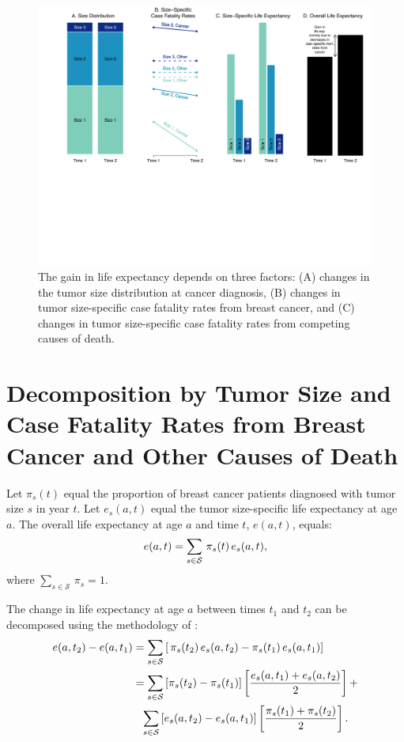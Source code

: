 \documentclass[11pt,letterpaper]{article}
\theoremstyle{plain}
\begin{document}
\begin{figure}[h]
\begin{center}
\includegraphics[trim=0 220 0 0,clip,width=\linewidth]{appendix_figure1}
\caption{The gain in life expectancy depends
  on three factors: (A) changes in the tumor size distribution at
  cancer diagnosis, (B) changes in tumor size-specific case fatality rates from
  breast cancer, and (C) changes in tumor size-specific case fatality rates from
  competing causes of death.}
\label{fig:simple_case}
\end{center}
\end{figure}

\section{Decomposition by Tumor Size and Case Fatality Rates from
  Breast Cancer and Other Causes of Death}
Let $\pi_s(t)$ equal the proportion of breast cancer patients
diagnosed with tumor size $s$ in year $t$.  Let $e_s(a,t)$ equal the
tumor size-specific life expectancy at age $a$. The overall life
expectancy at age $a$ and time $t$, $e(a,t)$, equals:
\begin{eqnarray}
  e(a,t)=\sum_{s\in\mathcal{S}}\,\pi_s(t)\,e_s(a,t), \notag
\end{eqnarray}
where $\sum_{s\in\mathcal{S}}\,\pi_s=1$. 

The change in life expectancy at age $a$ between times $t_1$ and $t_2$
can be decomposed using the methodology of \cite{Kitagawa55}:
\begin{align}
  e(a,t_2)-e(a,t_1)&=\sum_{s\in\mathcal{S}}\left[\,\pi_s(t_2)\,e_s(a,t_2)- \pi_s(t_1)\,e_s(a,t_1)\right]  \notag\\
  \hspace{-0.7in} &=\sum_{s\in\mathcal{S}}\left[\pi_s(t_2)-\pi_s(t_1)
  \right]\left[\frac{e_s(a,t_1)+e_s(a,t_2)}{2}\right]+ \notag\\
  &\phantom{=}\sum_{s\in\mathcal{S}}\left[e_s(a,t_2)-e_s(a,t_1)
  \right]\left[\frac{\pi_s(t_1)+\pi_s(t_2)}{2}\right].
 \label{eqn:decomp.basic}
\end{align}
 
\end{document}

